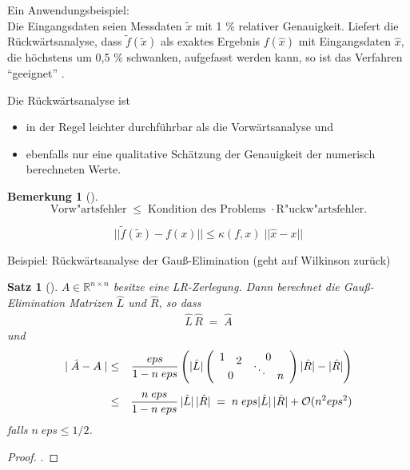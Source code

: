 \documentclass[ngerman,fontsize=11pt, paper=a4, parskip=half, titlepage=true, toc=bib]{scrbook}
\theoremstyle{definition}
\newtheorem{Bem}[Def]{Bemerkung}	%
\theoremstyle{plain}
\newtheorem{Satz}[Def]{Satz}		%
\newcommand{\R}{\mathds{R}}
\newcommand{\subsectione}[1]{\subsection{#1} \addtocounter{Def}{1}}
\newenvironment{Satze}[1][]{ %
	\begin{Satz}[#1]
}
{
	\end{Satz}
	\addtocounter{subsection}{1}
}
\newenvironment{Beme}[1][]{ %
	\begin{Bem}[#1]
	}
	{
	\end{Bem}
	\addtocounter{subsection}{1}
}
\begin{document}
  Ein Anwendungsbeispiel:\\
  Die Eingangsdaten seien Messdaten $\tilde{x}$  mit 1 \% relativer Genauigkeit. 
  Liefert die Rückwärtsanalyse, dass $\tilde{f} (\tilde{x})$ als exaktes Ergebnis 
  $f(\hat x)$ mit Eingangsdaten $\hat x$, 
  die höchstens um 0,5 \% schwanken, aufgefasst werden kann,
  so ist das Verfahren \enquote{geeignet} . 
  
  Die Rückwärtsanalyse ist
  \begin{itemize}
  \item in der Regel leichter durchführbar als die
    Vorwärtsanalyse  und 
  \item ebenfalls nur eine qualitative Schätzung der
    Genauigkeit der numerisch berechneten Werte.
  \end{itemize}
  
  \begin{Beme}
  	$$ \mbox{Vorw"artsfehler} \; \leq \; \mbox{Kondition des
  		Problems } \cdot \mbox{R"uckw"artsfehler} .$$
  	
  	$$ ||\tilde f (\tilde x)  - f(x)|| \leq \kappa (f,x) \; || \hat x -x|| $$
  	
  	Beispiel: Rückwärtsanalyse der Gauß-Elimination
  	(geht auf Wilkinson zurück)
  \end{Beme}
  
  
  \begin{Satze}
  		$A \in \R^{n\times n}$ besitze eine LR-Zerlegung. Dann berechnet die
  		Gauß-Elimination Matrizen $\hat{L}$ und $\hat{R}$,
  		so dass
  		\begin{gather*}\hat{L}\,\hat{R}\; = \;\hat{A}\end{gather*}
  		und
  		\begin{align*}
  		\mid \hat{ A} -  A \mid & \leq & \frac{eps}{1 -n \;eps}
  		\left( | \hat{ L} | \left( \begin{array}{cccc}
  		1 && \multicolumn{2}{c}{0}\\[-2ex] & 2
  		&&\\[-2ex]
  		&&\ddots & \\[-2ex]  \multicolumn{2}{c}{0} && n
  		\end{array} \right)
  		| \hat{ R} | - |\hat{ R}| \right)
  		\\[1ex]
  		& \leq & \frac{n \; eps}{1- n \;eps}\, | \hat{ L} | \,
  		|\hat{ R}| \; 
  		= \; n \; eps  | \hat{ L} | \,  |\hat{ R}| +
  		\mathcal{O}( n^2 eps^2)
  		\end{align*}
  		falls $n\;eps \leq 1/2$.
  \end{Satze}
    		\begin{proof}
    			\cite[siehe][]{stoerbulirsch}.
    		\end{proof}
  
\end{document}
